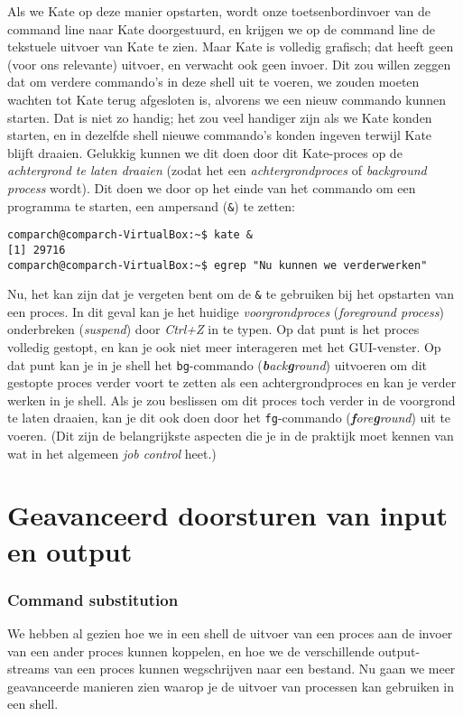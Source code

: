 \documentclass[a4paper,twoside,openany]{memoir}
\begin{document}
Als we Kate op deze manier opstarten, wordt onze toetsenbordinvoer van de
command line naar Kate doorgestuurd, en krijgen we op de command line de
tekstuele uitvoer van Kate te zien. Maar Kate is volledig grafisch; dat heeft
geen (voor ons relevante) uitvoer, en verwacht ook geen invoer. Dit zou willen
zeggen dat om verdere commando's in deze shell uit te voeren, we zouden moeten
wachten tot Kate terug afgesloten is, alvorens we een nieuw commando kunnen
starten. Dat is niet zo handig; het zou veel handiger zijn als we Kate konden
starten, en in dezelfde shell nieuwe commando's konden ingeven terwijl Kate
blijft draaien. Gelukkig kunnen we dit doen door dit Kate-proces op de
\emph{achtergrond te laten draaien} (zodat het een \emph{achtergrondproces} of
\emph{background process} wordt). Dit doen we door op het einde van het
commando om een programma te starten, een ampersand (\verb!&!) te zetten:

\begin{verbatim}
comparch@comparch-VirtualBox:~$ kate &
[1] 29716
comparch@comparch-VirtualBox:~$ egrep "Nu kunnen we verderwerken"
\end{verbatim}

Nu, het kan zijn dat je vergeten bent om de \verb!&! te gebruiken bij het
opstarten van een proces. In dit geval kan je het huidige
\emph{voorgrondproces} (\emph{foreground process}) onderbreken (\emph{suspend})
door \emph{Ctrl+Z} in te typen. Op dat punt is het proces volledig gestopt, en
kan je ook niet meer interageren met het GUI-venster. Op dat punt kan je in je
shell het \verb!bg!-commando (\emph{\textbf{b}ack\textbf{g}round}) uitvoeren om
dit gestopte proces verder voort te zetten als een achtergrondproces en kan je
verder werken in je shell. Als je zou beslissen om dit proces toch verder in de
voorgrond te laten draaien, kan je dit ook doen door het \verb!fg!-commando
(\emph{\textbf{f}ore\textbf{g}round}) uit te voeren. (Dit zijn de belangrijkste
aspecten die je in de praktijk moet kennen van wat in het algemeen \emph{job
control} heet.)

\chapter{Geavanceerd doorsturen van input en output}
\subsection{Command substitution}

We hebben al gezien hoe we in een shell de uitvoer van een proces aan de invoer
van een ander proces kunnen koppelen, en hoe we de verschillende output-streams
van een proces kunnen wegschrijven naar een bestand. Nu gaan we meer
geavanceerde manieren zien waarop je de uitvoer van processen kan gebruiken in
een shell.
\end{document}
